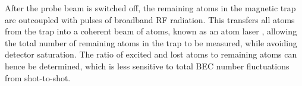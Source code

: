 \documentclass[%
 reprint,
 amsmath,amssymb,
 aps,
 prl,
]{revtex4-2}
\newcommand{\brycecom}[1]{{\color{ProcessBlue}[{#1}]\normalcolor}} %
\newcommand{\MetastableState}{2^{3\!}S_1}%
\begin{document}


%













After the probe beam is switched off, the remaining atoms in the magnetic trap are outcoupled with pulses of broadband RF radiation.
This transfers all atoms from the trap into a coherent beam of atoms, known as an atom laser \cite{Manning:10,Henson2018}, allowing the total number of remaining atoms in the trap to be measured, while avoiding detector saturation. The ratio of excited and lost atoms to remaining atoms can hence be determined, which is less sensitive to total BEC number fluctuations from shot-to-shot.
\end{document}
